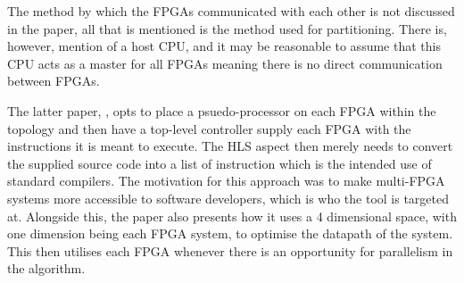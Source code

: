 The method by which the FPGAs communicated with each other is not discussed in the paper, all that is mentioned is the method used for partitioning. There is, however, mention of a host CPU, and it may be reasonable to assume that this CPU acts as a master for all FPGAs meaning there is no direct communication between FPGAs.

The latter paper, \cite{707888}, opts to place a psuedo-processor on each FPGA within the topology and then have a top-level controller supply each FPGA with the instructions it is meant to execute. The HLS aspect then merely needs to convert the supplied source code into a list of instruction which is the intended use of standard compilers. The motivation for this approach was to make multi-FPGA systems more accessible to software developers, which is who the tool is targeted at. Alongside this, the paper also presents how it uses a 4 dimensional space, with one dimension being each FPGA system, to optimise the datapath of the system. This then utilises each FPGA whenever there is an opportunity for parallelism in the algorithm.

